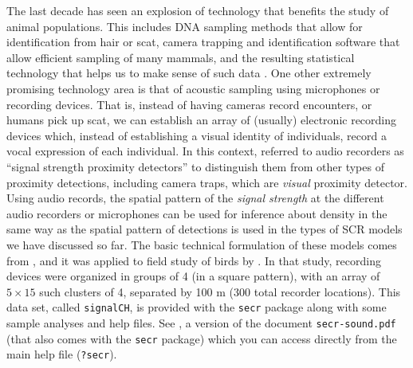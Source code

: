 The last decade has seen an explosion of technology that benefits the
study of animal populations. This includes DNA sampling methods that
allow for identification from hair or scat, camera trapping and
identification software that allow efficient sampling of many mammals,
and the resulting statistical technology that helps us to make sense
of such data \citep{borchers_efford:2008,
  royle_young:2008,efford_etal:2009ecol, gopalaswamy_etal:2012ecol,
  sollmann_etal:2012ecol, chandler_royle:2012}.  One other extremely
promising technology area is that of acoustic sampling using
microphones or recording devices.  That is, instead of having cameras
record encounters, or humans pick up scat, we can establish an array
of (usually) electronic recording devices which, instead of
establishing a visual identity of individuals, record a vocal
expression of each individual.  In this context,
\citet{efford_etal:2009ecol} referred to audio recorders as ``signal
strength proximity detectors'' to distinguish them from other types of
proximity detections, including camera traps, which are {\it visual}
proximity detector.  Using audio records, the spatial pattern of the
{\it signal strength} at the different audio recorders or microphones
can be used for inference about density
\citep{dawson_efford:2009,efford_etal:2009ecol} in the same way as the
spatial pattern of detections is used in the types of SCR models we
have discussed so far.  The basic technical formulation of these
models comes from \citet{efford_etal:2009ecol}, and it was applied to
field study of birds by \citet{dawson_efford:2009}. In that study,
recording devices were organized in groups of 4 (in a square pattern),
with an array of $5 \times 15$ such clusters of 4, separated by 100 m
(300 total recorder locations).  This data set, called
\verb+signalCH+, 
is provided with the \mbox{\tt secr} package along with some sample
analyses and help files.  See \citet{efford_dawson:2010}, a version of
the document \mbox{\tt secr-sound.pdf} (that also comes with the
\mbox{\tt secr} package) which you can access directly from the main
help file (\mbox{\tt ?secr}).

